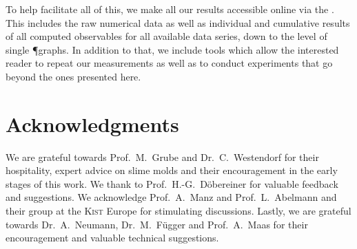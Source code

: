 		To help facilitate all of this, we make all our results accessible online via the \SMGR. This includes the raw numerical data as well as individual and cumulative results of all computed observables for all available data series, down to the level of single \P graphs. In addition to that, we include tools which allow the interested reader to repeat our measurements as well as to conduct experiments that go beyond the ones presented here.

	\section{Acknowledgments}

		We are grateful towards Prof.~M.~Grube and Dr.~C.~Westendorf for their hospitality, expert advice on slime molds and their encouragement in the early stages of this work. We thank to Prof.~H.-G.~D\"obereiner for valuable feedback and suggestions. We acknowledge Prof.~A.~Manz and Prof.~L.~Abelmann and their group at the \textsc{Kist} Europe for stimulating discussions. Lastly, we are grateful towards Dr.~A.~Neumann, Dr.~M.~F\"ugger and Prof.~A.~Maas for their encouragement and valuable technical suggestions.

